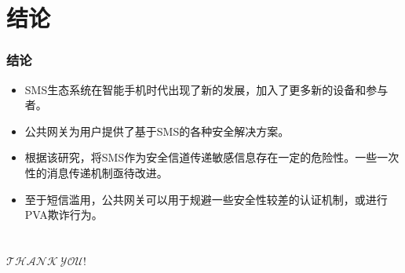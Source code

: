 \documentclass{beamer}
\begin{document}
\section[结论]{结论}


\begin{frame}
\frametitle{\textbf{结论}}

\begin{itemize}
\item SMS生态系统在智能手机时代出现了新的发展，加入了更多新的设备和参与者。
\item 公共网关为用户提供了基于SMS的各种安全解决方案。
\item 根据该研究，将SMS作为安全信道传递敏感信息存在一定的危险性。一些一次性的消息传递机制亟待改进。
\item 至于短信滥用，公共网关可以用于规避一些安全性较差的认证机制，或进行PVA欺诈行为。
\end{itemize}
\end{frame}



\section*{}
\begin{frame}
\Huge \centering $\mathcal{THANK \ 　YOU!}$
\end{frame}
\end{document}
